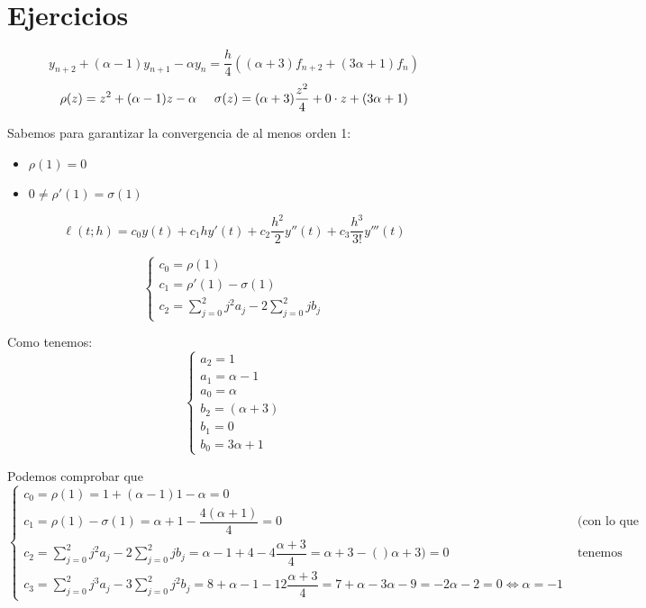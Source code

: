 \documentclass[openany]{book}
\begin{document}
    \section{Ejercicios}

    \setcounter{ex}{7}

    \begin{exercise}
       $$  y_{n+2} + (\alpha -1)y_{n+1} - \alpha y_n = \dfrac{h}{4}((\alpha+3)f_{n+2}+(3 \alpha +1 )f_n) $$
       $$ \rho(z) = z^2+(\alpha -1 )z -\alpha \hspace{5mm} \sigma(z) = (\alpha +3)\dfrac{z^2}{4} + 0\cdot z + (3 \alpha +1 ) $$

       Sabemos para garantizar la convergencia de al menos orden 1:
       \begin{itemize}
           \item $ \rho(1) = 0 $
           \item $ 0 \ne \rho'(1) = \sigma(1) $
       \end{itemize}

       $$ \ell(t;h) = c_0y(t)+c_1hy'(t)+c_2\dfrac{h^2}{2} y''(t) + c_3 \dfrac{h^3}{3!}y'''(t) $$

       $$ \left\{
       \begin{array}{l}
           c_0 = \rho(1)\\
           c_1 = \rho'(1)-\sigma(1)\\
           c_2 = \sum\limits_{j=0}^{2}j ^2 a_j - 2 \sum\limits_{j=0}^{2}jb_j
       \end{array}
       \right. $$

       Como tenemos:
       $$ \left\{
       \begin{array}{l}
           a_2 = 1\\
           a_1 = \alpha-1 \\
           a_0 = \alpha \\
           b_2 = (\alpha +3)\\
           b_1 = 0 \\
           b_0 = 3 \alpha +1 
       \end{array}
       \right. $$

       Podemos comprobar que 
       $$ \left\{
       \begin{array}{lr}
           c_0 = \rho(1) = 1 +(\alpha-1)1 - \alpha  = 0\\ 
           c_1 = \rho(1)-\sigma(1) = \alpha+1- \dfrac{4(\alpha +1)}{4} = 0 &  \text{ (con lo que tenemos estabilidad de primer orden)}\\
           c_2 = \sum\limits_{j=0}^{2}j^2a_j -2 \sum\limits_{j=0}^{2}jb_j = \alpha-1+4-4 \dfrac{\alpha+3}{4} = \alpha +3 - ()\alpha +3) = 0 & \text{ tenemos entonces que el orden es al menos dos}\\
           c_3 = \sum\limits_{j=0}^{2}j^3a_j - 3 \sum\limits_{j=0}^{2}j^2b_j = 8+ \alpha -1 -12 \dfrac{\alpha+3}{4} = 7+ \alpha -3 \alpha -9 = -2 \alpha -2 = 0 \iff \alpha = -1
       \end{array}
       \right. $$


\end{exercise}
\end{document}
